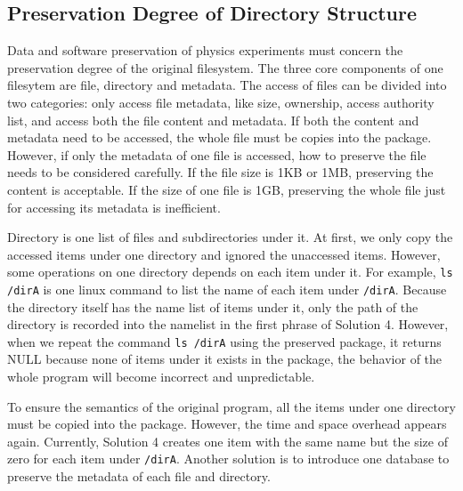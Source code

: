 \documentclass{sig-alternate}
\begin{document}
\subsection{Preservation Degree of Directory Structure}

Data and software preservation of physics experiments must concern the
preservation degree of the original filesystem.  The three core components of
one filesytem are file, directory and metadata.  The access of files can be
divided into two categories: only access file metadata, like size, ownership,
access authority list, and access both the file content and metadata.  If both
the content and metadata need to be accessed, the whole file must be copies
into the package.  However, if only the metadata of one file is accessed, how
to preserve the file needs to be considered carefully. If the file size
is 1KB or 1MB, preserving the content is acceptable. If the size of one file is
1GB, preserving the whole file just for accessing its metadata is
inefficient.  

Directory is one list of files and subdirectories under it. At first, we only
copy the accessed items under one directory and ignored the unaccessed items.
However, some operations on one directory depends on each item under it. For
example, {\tt ls /dirA} is one linux command to list the name of each item under
{\tt /dirA}. Because the directory itself has the name list of items under it, only
the path of the directory is recorded into the namelist in the first phrase of
Solution 4. However, when we repeat the command {\tt ls /dirA} using the preserved package, it returns NULL because none of items under it exists in
the package, the behavior of the whole program will become incorrect
and unpredictable. 

To ensure the semantics of the original program, all the items under one directory must be copied
into the package. However, the
time and space overhead appears again. Currently, Solution 4 creates one item
with the same name but the size of zero for each item under {\tt /dirA}. Another
solution is to introduce one database to preserve the metadata of each file and
directory. 
\end{document}
